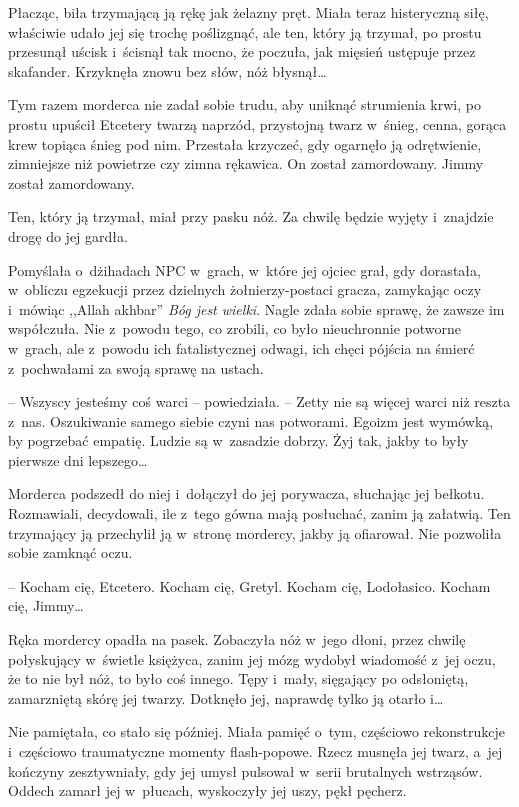 \documentclass[oneside,polish,11pt,sfheadings]{mwbk}
\begin{document}
Płacząc, biła
trzymającą ją rękę jak żelazny pręt. Miała teraz histeryczną siłę,
właściwie udało jej się trochę poślizgnąć, ale ten, który ją trzymał, po
prostu przesunął uścisk i~ścisnął tak mocno, że poczuła, jak mięsień
ustępuje przez skafander. Krzyknęła znowu bez słów, nóż błysnął\ldots 

Tym razem morderca nie zadał sobie trudu, aby uniknąć strumienia krwi,
po prostu upuścił Etcetery twarzą naprzód, przystojną twarz w~śnieg,
cenna, gorąca krew topiąca śnieg pod nim. Przestała krzyczeć, gdy
ogarnęło ją odrętwienie, zimniejsze niż powietrze czy zimna rękawica. On
został zamordowany. Jimmy został zamordowany.

Ten, który ją trzymał, miał przy pasku nóż. Za chwilę będzie wyjęty i~znajdzie drogę do jej gardła.

Pomyślała o~dżihadach NPC w~grach, w~które jej ojciec grał, gdy
dorastała, w~obliczu egzekucji przez dzielnych żołnierzy-postaci gracza,
zamykając oczy i~mówiąc ,,Allah akhbar'' \textit{Bóg jest wielki}. Nagle
zdała sobie sprawę, że zawsze im współczuła. Nie z~powodu tego, co
zrobili, co było nieuchronnie potworne w~grach, ale z~powodu ich
fatalistycznej odwagi, ich chęci pójścia na śmierć z~pochwałami za swoją
sprawę na ustach.

-- Wszyscy jesteśmy coś warci -- powiedziała. -- Zetty nie są więcej warci
niż reszta z~nas. Oszukiwanie samego siebie czyni nas potworami. Egoizm
jest wymówką, by pogrzebać empatię. Ludzie są w~zasadzie dobrzy. Żyj
tak, jakby to były pierwsze dni lepszego\ldots 

Morderca podszedł do niej i~dołączył do jej porywacza, słuchając jej
bełkotu. Rozmawiali, decydowali, ile z~tego gówna mają posłuchać, zanim
ją załatwią. Ten trzymający ją przechylił ją w~stronę mordercy, jakby ją
ofiarował. Nie pozwoliła sobie zamknąć oczu.

-- Kocham cię, Etcetero. Kocham cię, Gretyl. Kocham cię, Lodołasico.
Kocham cię, Jimmy\ldots 

Ręka mordercy opadła na pasek. Zobaczyła nóż w~jego dłoni, przez chwilę
połyskujący w~świetle księżyca, zanim jej mózg wydobył wiadomość z~jej
oczu, że to nie był nóż, to było coś innego. Tępy i~mały, sięgający po
odsłoniętą, zamarzniętą skórę jej twarzy. Dotknęło jej, naprawdę tylko
ją otarło i\ldots 

Nie pamiętała, co stało się później. Miała pamięć o~tym, częściowo
rekonstrukcje i~częściowo traumatyczne momenty flash-popowe. Rzecz
musnęła jej twarz, a~jej kończyny zesztywniały, gdy jej umysł pulsował w~serii brutalnych wstrząsów. Oddech zamarł jej w~płucach, wyskoczyły jej
uszy, pękł pęcherz.
\end{document}
